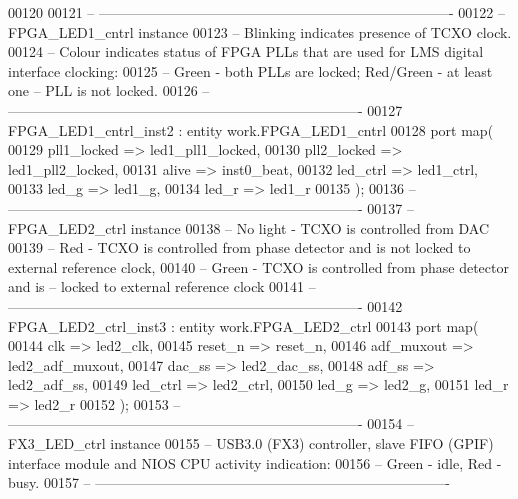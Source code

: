\begin{DoxyCode}
00120    
00121 \textcolor{keyword}{-- ----------------------------------------------------------------------------}
00122 \textcolor{keyword}{-- FPGA\_LED1\_cntrl instance}
00123 \textcolor{keyword}{-- Blinking indicates presence of TCXO clock.}
00124 \textcolor{keyword}{-- Colour indicates status of FPGA PLLs that are used for LMS digital interface clocking: }
00125 \textcolor{keyword}{-- Green - both PLLs are locked; Red/Green - at least one -- PLL is not locked.}
00126 \textcolor{keyword}{-- ----------------------------------------------------------------------------    }
00127    FPGA\_LED1\_cntrl\_inst2 : \textcolor{keywordflow}{entity} work.FPGA_LED1_cntrl
00128    \textcolor{keywordflow}{port} \textcolor{keywordflow}{map}(
00129       pll1_locked    => led1_pll1_locked,
00130       pll2_locked    => led1_pll2_locked,
00131       alive          => inst0_beat,
00132       led_ctrl       => led1_ctrl,
00133       led_g          => led1_g,
00134       led_r          => led1_r
00135    \textcolor{vhdlchar}{)};
00136 \textcolor{keyword}{-- ----------------------------------------------------------------------------}
00137 \textcolor{keyword}{-- FPGA\_LED2\_ctrl instance}
00138 \textcolor{keyword}{-- No light - TCXO is controlled from DAC}
00139 \textcolor{keyword}{-- Red - TCXO is controlled from phase detector and is not locked to external reference clock,}
00140 \textcolor{keyword}{-- Green - TCXO is controlled from phase detector and is -- locked to external reference clock}
00141 \textcolor{keyword}{-- ---------------------------------------------------------------------------- }
00142    FPGA\_LED2\_ctrl\_inst3 : \textcolor{keywordflow}{entity} work.FPGA_LED2_ctrl
00143       \textcolor{keywordflow}{port} \textcolor{keywordflow}{map}(
00144          clk            => led2_clk,
00145          reset_n        => reset_n,
00146          adf_muxout     => led2_adf_muxout,
00147          dac_ss         => led2_dac_ss,
00148          adf_ss         => led2_adf_ss,
00149          led_ctrl       => led2_ctrl,
00150          led_g          => led2_g,
00151          led_r          => led2_r
00152       \textcolor{vhdlchar}{)};
00153 \textcolor{keyword}{-- ----------------------------------------------------------------------------}
00154 \textcolor{keyword}{-- FX3\_LED\_ctrl instance}
00155 \textcolor{keyword}{-- USB3.0 (FX3) controller, slave FIFO (GPIF) interface module and NIOS CPU activity indication:}
00156 \textcolor{keyword}{-- Green - idle, Red - busy.}
00157 \textcolor{keyword}{-- ---------------------------------------------------------------------------- }

\end{DoxyCode}
